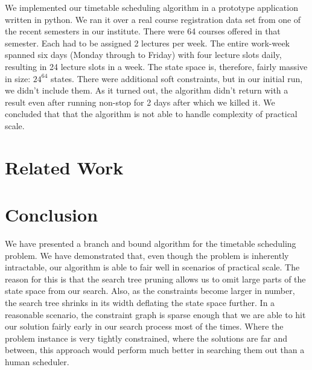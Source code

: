 \documentclass[11pt,a4paper]{article}
\begin{document}
We implemented our timetable scheduling algorithm in a prototype application written in python. We ran it over a real course registration data set from one of the recent semesters in our institute. There were 64 courses offered in that semester. Each had to be assigned 2 lectures per week. The entire work-week spanned six days (Monday through to Friday) with four lecture slots daily, resulting in 24 lecture slots in a week. The state space is, therefore, fairly massive in size: $24^{64}$ states. There were additional soft constraints, but in our initial run, we didn't include them. As it turned out, the algorithm didn't return with a result even after running non-stop for 2 days after which we killed it. We concluded that that the algorithm is not able to handle complexity of practical scale.
\section{Related Work}

\section{Conclusion}
We have presented a branch and bound algorithm for the timetable scheduling problem. We have demonstrated that, even though the problem is inherently intractable, our algorithm is able to fair well in scenarios of practical scale. The reason for this is that the search tree pruning allows us to omit large parts of the state space from our search. Also, as the constraints become larger in number, the search tree shrinks in its width deflating the state space further. In a reasonable scenario, the constraint graph is sparse enough that we are able to hit our solution fairly early in our search process most of the times. Where the problem instance is very tightly constrained, where the solutions are far and between, this approach would perform much better in searching them out than a human scheduler.
\end{document}
